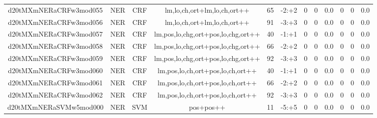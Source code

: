 \documentclass[a4paper]{article}
\begin{document}
\begin{landscape}
\begin{center}
\begin{tabular}{ |c|c|c|c|c|c|c|c|c|c|c|c|}
 
 	
 	\small{ d20tMXmNERaCRFw3mod055 } & \small{ NER} & \small{  CRF }  & lm,lo,ch,ort+lm,lo,ch,ort++  &  65 &  \small{  -2:+2 }  &  0 & 0 & 0.0  &  0 & 0 & 0.0 \\
 	

 
 	
 	\small{ d20tMXmNERaCRFw3mod056 } & \small{ NER} & \small{  CRF }  & lm,lo,ch,ort+lm,lo,ch,ort++  &  91 &  \small{  -3:+3 }  &  0 & 0 & 0.0  &  0 & 0 & 0.0 \\
 	

 
 	
 	\small{ d20tMXmNERaCRFw3mod057 } & \small{ NER} & \small{  CRF }  & lm,pos,lo,chg,ort+pos,lo,chg,ort++  &  40 &  \small{  -1:+1 }  &  0 & 0 & 0.0  &  0 & 0 & 0.0 \\
 	

 
 	
 	\small{ d20tMXmNERaCRFw3mod058 } & \small{ NER} & \small{  CRF }  & lm,pos,lo,chg,ort+pos,lo,chg,ort++  &  66 &  \small{  -2:+2 }  &  0 & 0 & 0.0  &  0 & 0 & 0.0 \\
 	

 
 	
 	\small{ d20tMXmNERaCRFw3mod059 } & \small{ NER} & \small{  CRF }  & lm,pos,lo,chg,ort+pos,lo,chg,ort++  &  92 &  \small{  -3:+3 }  &  0 & 0 & 0.0  &  0 & 0 & 0.0 \\
 	

 
 	
 	\small{ d20tMXmNERaCRFw3mod060 } & \small{ NER} & \small{  CRF }  & lm,pos,lo,ch,ort+pos,lo,ch,ort++  &  40 &  \small{  -1:+1 }  &  0 & 0 & 0.0  &  0 & 0 & 0.0 \\
 	

 
 	
 	\small{ d20tMXmNERaCRFw3mod061 } & \small{ NER} & \small{  CRF }  & lm,pos,lo,ch,ort+pos,lo,ch,ort++  &  66 &  \small{  -2:+2 }  &  0 & 0 & 0.0  &  0 & 0 & 0.0 \\
 	

 
 	
 	\small{ d20tMXmNERaCRFw3mod062 } & \small{ NER} & \small{  CRF }  & lm,pos,lo,ch,ort+pos,lo,ch,ort++  &  92 &  \small{  -3:+3 }  &  0 & 0 & 0.0  &  0 & 0 & 0.0 \\
 	

 
 	
 	\small{ d20tMXmNERaSVMw5mod000 } & \small{ NER} & \small{  SVM }  & pos+pos++  &  11 &  \small{  -5:+5 }  &  0 & 0 & 0.0  &  0 & 0 & 0.0 \\
 	


\end{tabular}
\end{center}
\end{landscape}
\end{document}
